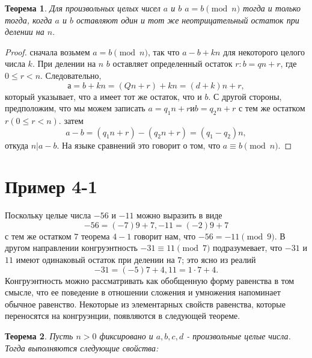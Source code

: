 \documentclass[11pt]{article}
\newtheorem{theorem}{Теорема}
\begin{document}
	\begin{theorem}
		Для произвольных целых чисел $a$ и $b$ $a = b \pmod{n}$ тогда и только тогда, когда $a$ и $b$ оставляют один и тот же неотрицательный остаток при делении на $n$.
	\end{theorem}
	\begin{proof}
		сначала возьмем $a = b \pmod{n}$, так что $a-b + kn$ для некоторого целого числа $k$. При делении на $n$ $b$ оставляет определенный остаток $r: b = qn + r$, где $0 \leq r <n$. Следовательно,
		\[
		а = b + kn = (Qn + r) + kn = (d + k) n + r,
		\]
		который указывает, что $а$ имеет тот же остаток, что и $b$.
		С другой стороны, предположим, что мы можем записать $a = q_{1}n + r и b = q_{2}n + r$ с тем же остатком $r (0 \leq r <n)$. затем
		\[
		a-b = (q_{1}n + r) - (q_{2}n + r) = (q_{1}-q_{2}) n,
		\]
		откуда $n | a-b$. На языке сравнений это говорит о том, что $a \equiv b \pmod{n}$.
	\end{proof}
	
	
	
	\section{Пример 4-1}
	Поскольку целые числа $-56$ и $-11$ можно выразить в виде
	\[
		-56 = (- 7) 9 + 7, -11 = (- 2) 9 + 7
	\]
	с тем же остатком $7$ теорема $4-1$ говорит нам, что $-56 = -11 \pmod{9}$. В другом направлении конгруэнтность $-31 \equiv 11 \pmod{7}$ подразумевает, что $-31$ и $11$ имеют одинаковый остаток при делении на $7$; это ясно из реалий
	\[
		-31 = (-5) 7 + 4, 11 = 1 \cdot 7 + 4.
	\]
	Конгруэнтность можно рассматривать как обобщенную форму равенства в том смысле, что ее поведение в отношении сложения и умножения напоминает обычное равенство. Некоторые из элементарных свойств равенства, которые переносятся на конгруэнции, появляются в следующей теореме.
	
	\begin{theorem}
		Пусть $n> 0$ фиксировано и $a, b, c, d$ - произвольные целые числа. Тогда выполняются следующие свойства:
	\end{theorem}
	
\end{document}
